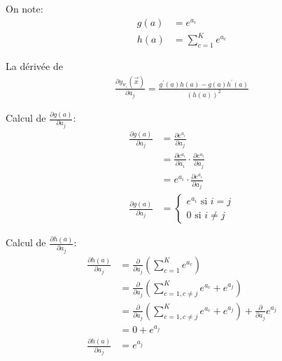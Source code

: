 On note:
\begin{equation}
\begin{split}
	g(a) &= e^{a_i} \\
	h(a) &= \sum_{c=1}^Ke^{a_c}
\end{split}
\end{equation}

La dérivée de 
\begin{equation}
\begin{split}
	\frac{\partial y_{w_i}(\overrightarrow{x})} {\partial a_j} = \frac{g^{'}(a) h(a) - g(a) h^{'}(a)} {(h(a))^2}
\end{split}
\end{equation}

Calcul de $ \frac{\partial g(a)} {\partial a_j} $:
\begin{equation}
\begin{split}
	 \frac{\partial g(a)} {\partial a_j} &= \frac{\partial e^{a_i}} {\partial a_j} \\
	 &= \frac{\partial e^{a_i}} {\partial a_i} \cdot \frac{\partial e^{a_i}} {\partial a_j} \\
	 &= e^{a_i} \cdot \frac{\partial e^{a_i}} {\partial a_j} \\
	 \frac{\partial g(a)} {\partial a_j} &= 
	 \begin{cases}
		 e^{a_i} \text{ si } i=j \\
		 0 \text{ si } i \neq j
	 \end{cases} 
\end{split}
\end{equation}

Calcul de $ \frac{\partial h(a)} {\partial a_j} $:
\begin{equation}
\begin{split}
	\frac{\partial h(a)} {\partial a_j} &= \frac{\partial}{\partial a_j} (\sum_{c=1}^K e^{a_c}) \\
	&= \frac{\partial}{\partial a_j}  \left( \sum_{c=1, c \neq j}^K e^{a_c} + e^{a_j} \right) \\
	&= \frac{\partial}{\partial a_j} \left( \sum_{c=1, c \neq j}^K e^{a_c} + e^{a_j} \right) +  \frac{\partial}{\partial a_j} e^{a_j} \\
	&= 0 + e^{a_j} \\
	\frac{\partial h(a)} {\partial a_j} &=  e^{a_j}
\end{split}
\end{equation}

